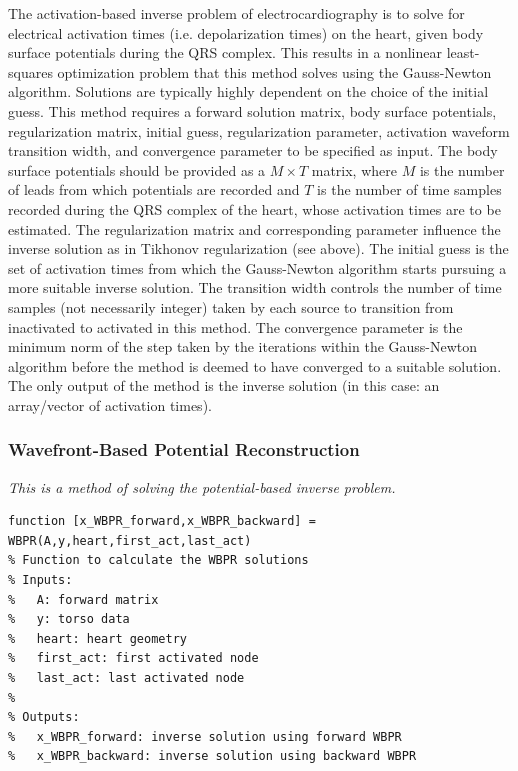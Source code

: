 \documentclass[fleqn,11pt,openany]{book}
\begin{document}
The activation-based inverse problem of electrocardiography is to solve for electrical activation times (i.e. depolarization times) on the heart, given body surface potentials during the QRS complex. This results in a nonlinear least-squares optimization problem that this method solves using the Gauss-Newton algorithm. Solutions are typically highly dependent on the choice of the initial guess. This method requires a forward solution matrix, body surface potentials, regularization matrix, initial guess, regularization parameter, activation waveform transition width, and convergence parameter to be specified as input. The body surface potentials should be provided as a $M \times T$ matrix, where $M$ is the number of leads from which potentials are recorded and $T$ is the number of time samples recorded during the QRS complex of the heart, whose activation times are to be estimated. The regularization matrix and corresponding parameter influence the inverse solution as in Tikhonov regularization (see above). The initial guess is the set of activation times from which the Gauss-Newton algorithm starts pursuing a more suitable inverse solution. The transition width controls the number of time samples (not necessarily integer) taken by each source to transition from inactivated to activated in this method. The convergence parameter is the minimum norm of the step taken by the iterations within the Gauss-Newton algorithm before the method is deemed to have converged to a suitable solution. The only output of the method is the inverse solution (in this case: an array/vector of activation times).

\subsubsection{Wavefront-Based Potential Reconstruction}

\vspace{5pt}\textit{This is a method of solving the potential-based inverse problem.}\vspace{5pt}

\begin{verbatim}
function [x_WBPR_forward,x_WBPR_backward] = WBPR(A,y,heart,first_act,last_act)
% Function to calculate the WBPR solutions
% Inputs:
%   A: forward matrix
%   y: torso data
%   heart: heart geometry
%   first_act: first activated node
%   last_act: last activated node
%
% Outputs:
%   x_WBPR_forward: inverse solution using forward WBPR
%   x_WBPR_backward: inverse solution using backward WBPR
\end{verbatim}
\end{document}
